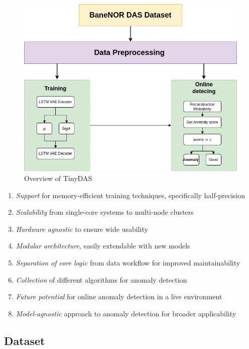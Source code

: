 \begin{figure}[!h]
    \centering
    \includegraphics[scale=0.5]{figures/methodflow.png}
    \caption{Overview of TinyDAS}
    \label{fig:dataflow}
\end{figure}


\begin{enumerate}
    \item \textit{Support} for memory-efficient training techniques, specifically half-precision
    \item \textit{Scalability} from single-core systems to multi-node clusters
    \item \textit{Hardware agnostic} to ensure wide usability
    \item \textit{Modular architecture}, easily extendable with new models
    \item \textit{Separation of core logic} from data workflow for improved maintainability
    \item \textit{Collection} of different algorithms for anomaly detection
    \item \textit{Future potential} for online anomaly detection in a live environment
    \item \textit{Model-agnostic} approach to anomaly detection for broader applicability
\end{enumerate}

\subsection{Dataset}

